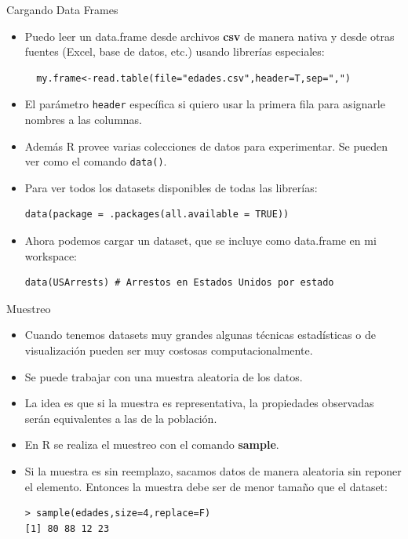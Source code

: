 \documentclass[handout]{beamer}
\begin{document}
\begin{frame}[fragile]{Cargando Data Frames}
\scriptsize{
\begin{itemize}
 \item Puedo leer un data.frame desde archivos \textbf{csv} de manera nativa y desde otras fuentes (Excel, base de datos, etc.) usando librerías especiales:
 \begin{verbatim}
  my.frame<-read.table(file="edades.csv",header=T,sep=",")
 \end{verbatim}
\item El parámetro \verb+header+ específica si quiero usar la primera fila para asignarle nombres a las columnas.

\item Además R provee varias colecciones de datos para experimentar. Se pueden ver como el comando \verb+data()+.

\item Para ver todos los datasets disponibles de todas las librerías:
\begin{verbatim}
data(package = .packages(all.available = TRUE)) 
\end{verbatim}

\item Ahora podemos cargar un dataset, que se incluye como data.frame en mi workspace:
\begin{verbatim}
data(USArrests) # Arrestos en Estados Unidos por estado 
\end{verbatim}

 
\end{itemize}



}
\end{frame}



\begin{frame}[fragile]{Muestreo}
\scriptsize{
\begin{itemize}
 \item Cuando tenemos datasets muy grandes algunas técnicas estadísticas o de visualización pueden ser muy costosas computacionalmente.
 \item Se puede trabajar con una muestra aleatoria de los datos. 
 
 \item La idea es que si la muestra es representativa, la propiedades observadas serán equivalentes a las de la población.  
 
 \item En R se realiza el muestreo con el comando \textbf{sample}.
 
 \item Si la muestra es sin reemplazo, sacamos datos de manera aleatoria sin reponer el elemento. Entonces la muestra debe ser de menor tamaño que el dataset:

 \begin{verbatim}
> sample(edades,size=4,replace=F)
[1] 80 88 12 23
\end{verbatim}
\end{itemize}



}
\end{frame}
\end{document}
